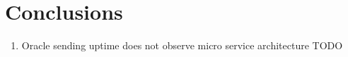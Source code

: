\documentclass[]{article}
\begin{document}
\section{Conclusions}
\begin{enumerate}
	\item Oracle sending uptime does not observe micro service architecture 	{\color{red} TODO} 
\end{enumerate}
\end{document}
